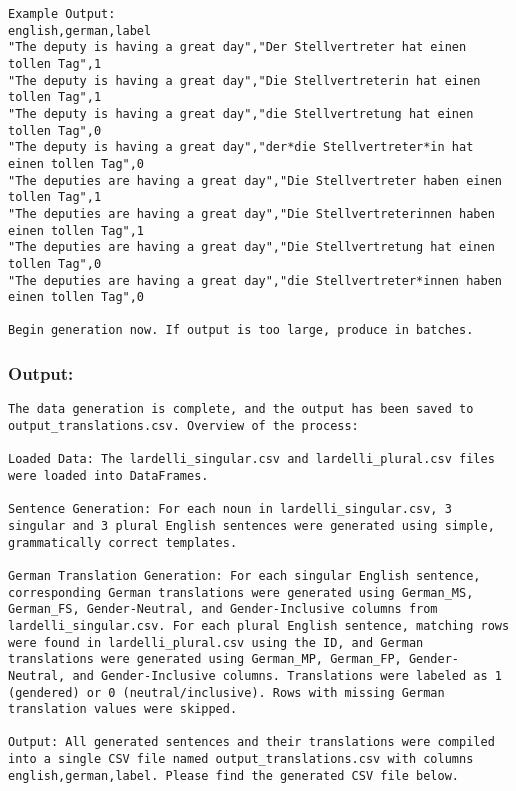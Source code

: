\begin{appendices}
\begin{lstlisting}
Example Output:
english,german,label
"The deputy is having a great day","Der Stellvertreter hat einen tollen Tag",1
"The deputy is having a great day","Die Stellvertreterin hat einen tollen Tag",1
"The deputy is having a great day","die Stellvertretung hat einen tollen Tag",0
"The deputy is having a great day","der*die Stellvertreter*in hat einen tollen Tag",0
"The deputies are having a great day","Die Stellvertreter haben einen tollen Tag",1
"The deputies are having a great day","Die Stellvertreterinnen haben einen tollen Tag",1
"The deputies are having a great day","Die Stellvertretung hat einen tollen Tag",0
"The deputies are having a great day","die Stellvertreter*innen haben einen tollen Tag",0

Begin generation now. If output is too large, produce in batches.

\end{lstlisting}

\subsubsection{Output: } 
\begin{lstlisting}
The data generation is complete, and the output has been saved to output_translations.csv. Overview of the process:

Loaded Data: The lardelli_singular.csv and lardelli_plural.csv files were loaded into DataFrames.

Sentence Generation: For each noun in lardelli_singular.csv, 3 singular and 3 plural English sentences were generated using simple, grammatically correct templates.

German Translation Generation: For each singular English sentence, corresponding German translations were generated using German_MS, German_FS, Gender-Neutral, and Gender-Inclusive columns from lardelli_singular.csv. For each plural English sentence, matching rows were found in lardelli_plural.csv using the ID, and German translations were generated using German_MP, German_FP, Gender-Neutral, and Gender-Inclusive columns. Translations were labeled as 1 (gendered) or 0 (neutral/inclusive). Rows with missing German translation values were skipped.

Output: All generated sentences and their translations were compiled into a single CSV file named output_translations.csv with columns english,german,label. Please find the generated CSV file below.

\end{lstlisting}


\end{appendices}
